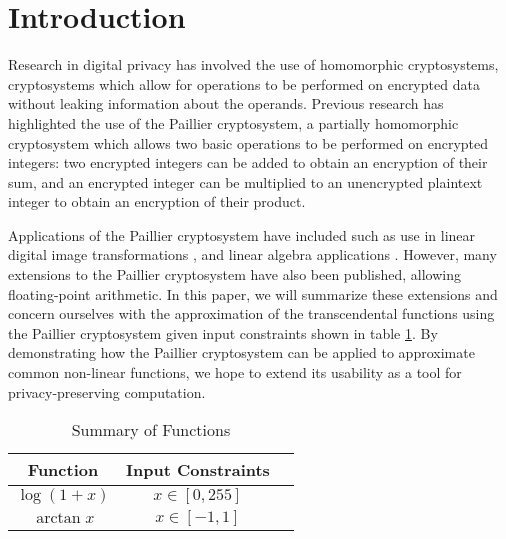 \section{Introduction}
Research in digital privacy has involved the use of homomorphic cryptosystems, cryptosystems which allow for operations to be performed on encrypted data without leaking information about the operands.
Previous research has highlighted the use of the Paillier cryptosystem, a partially homomorphic cryptosystem which allows two basic operations to be performed on encrypted integers: two encrypted integers can be added to obtain an encryption of their sum, and an encrypted integer can be multiplied to an unencrypted plaintext integer to obtain an encryption of their product.

Applications of the Paillier cryptosystem have included such as use in linear digital image transformations \cite{ziad_cryptoimg:_2016}, and linear algebra applications \cite{hutchison_privacy-preserving_2009}. However, many extensions to the Paillier cryptosystem have also been published, allowing floating-point arithmetic. In this paper, we will summarize these extensions and concern ourselves with the approximation of the transcendental functions using the Paillier cryptosystem given input constraints shown in table \ref{tab:inputconstraints}. By demonstrating how the Paillier cryptosystem can be applied to approximate common non-linear functions, we hope to extend its usability as a tool for privacy-preserving computation.
\begin{table}
	\caption{Summary of Functions}
	\label{tab:inputconstraints}
	\begin{tabular}{ccl}
		\toprule
		Function & Input Constraints\\
		\midrule
		$\log(1+x)$ & $x\in[0,255]$\\
		$\arctan x$ & $x\in[-1,1]$\\
	\bottomrule
\end{tabular}
\end{table}

